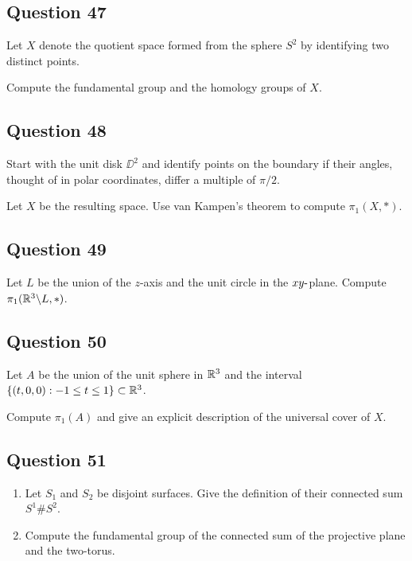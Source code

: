 \documentclass[12pt]{article}
\begin{document}
\hypertarget{question-47-3}{%
\subsection{Question 47}\label{question-47-3}}

Let \(X\) denote the quotient space formed from the sphere \(S^2\) by
identifying two distinct points.

Compute the fundamental group and the homology groups of \(X\).

\hypertarget{question-48-3}{%
\subsection{Question 48}\label{question-48-3}}

Start with the unit disk \(\DD^2\) and identify points on the boundary
if their angles, thought of in polar coordinates, differ a multiple of
\(\pi/2\).

Let \(X\) be the resulting space. Use van Kampen's theorem to compute
\(\pi_1 (X, \ast)\).

\hypertarget{question-49-3}{%
\subsection{Question 49}\label{question-49-3}}

Let \(L\) be the union of the \(z\)-axis and the unit circle in the
\(xy{\hbox{-}}\)plane. Compute \(\pi_1 ({\mathbb{R}}^3 \backslash L, \ast)\).

\hypertarget{question-50-3}{%
\subsection{Question 50}\label{question-50-3}}

Let \(A\) be the union of the unit sphere in \({\mathbb{R}}^3\) and the interval
\(\left\{{(t, 0, 0) : -1 \leq t \leq 1}\right\} \subset {\mathbb{R}}^3\).

Compute \(\pi_1 (A)\) and give an explicit description of the universal
cover of \(X\).

\hypertarget{question-51-3}{%
\subsection{Question 51}\label{question-51-3}}

\begin{enumerate}
\def\labelenumi{\alph{enumi}.}
\item
  Let \(S_1\) and \(S_2\) be disjoint surfaces. Give the definition of
  their connected sum \(S^1 \#S^2\).
\item
  Compute the fundamental group of the connected sum of the projective
  plane and the two-torus.
\end{enumerate}
\end{document}
